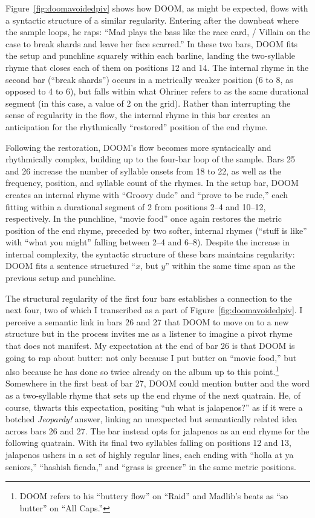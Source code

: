 Figure~\ref{fig:doomavoidedpiv} shows how DOOM, as might be expected, flows with a syntactic structure of a 
similar regularity. Entering after the downbeat where the sample loops, he raps: ``Mad plays the bass like the
race card, / Villain on the case to break shards and leave her face scarred.'' In these two bars, DOOM fits the
setup and punchline squarely within each barline, landing the two-syllable rhyme that closes each of them on 
positions 12 and 14. The internal rhyme in the second bar (``break shards'') occurs in a metrically weaker
position (6 to 8, as opposed to 4 to 6), but falls within what Ohriner refers to as the same durational segment
(in this case, a value of 2 on the grid). Rather than interrupting the sense of regularity in the flow, the 
internal rhyme in this bar creates an anticipation for the rhythmically ``restored'' position of the end rhyme.

Following the restoration, DOOM's flow becomes more syntacically and rhythmically complex, building up to
the four-bar loop of the sample. Bars 25 and 26 increase the number of syllable onsets from 18 to 22, as 
well as the  frequency, position, and syllable count of the rhymes. In the setup bar, DOOM creates an 
internal rhyme with ``Groovy dude'' and ``prove to  be rude,'' each fitting within a durational segment of
2 from positions 2--4 and 10--12, respectively. In the punchline, ``movie food'' once again restores the
metric position of the end rhyme, preceded by two softer, internal rhymes (``stuff is like'' with ``what
you might'' falling between 2--4 and 6--8). Despite the increase in internal complexity, the  syntactic 
structure of these bars maintains regularity: DOOM fits a sentence structured ``$x$, but $y$'' within the
same time span as the previous setup and punchline.
\clearpage

The structural regularity of the first four bars establishes a connection to the next four, two of which I
transcribed as a part of Figure~\ref{fig:doomavoidedpiv}. I perceive a semantic link in bars 26 and 27 that
DOOM to move on to a new structure but in the process invites me as a listener to imagine a pivot rhyme that
does not manifest. My expectation at the end  of bar 26 is that DOOM is going to rap about butter: not only 
because I put butter on ``movie food,'' but also because he has done so twice already on the album up to this
point.\footnote{
    DOOM refers to his ``buttery flow'' on ``Raid'' and Madlib's beats as ``so butter'' on ``All 
    Caps.''}
Somewhere in the first beat of bar 27, DOOM could mention butter and the word as a two-syllable rhyme that
sets up the end rhyme of the next quatrain. He, of course, thwarts this expectation, positing ``uh\textellipsis
what is jalapenos?'' as if  it were a botched  \textit{Jeopardy!} answer, linking an unexpected but semantically
related idea across bars 26 and 27. The bar instead opts for jalapenos as an end rhyme for the following quatrain.
With its final two syllables falling on positions 12 and 13, jalapenos ushers in a set of highly regular lines,
each ending with ``holla at ya  seniors,'' ``hashish fienda,'' and ``grass is greener'' in the same metric 
positions.

